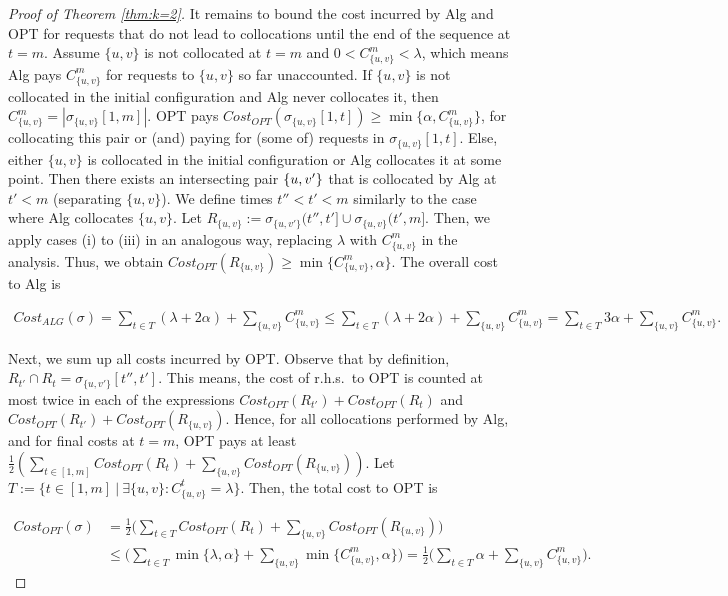 \documentclass[manuscript,screen=true, review, anonymous]{acmart}
\DeclarePairedDelimiter\set{\{}{\}}
\begin{document}
\begin{proof}[Proof of Theorem \ref{thm:k=2}]
	It remains to bound the cost incurred by Alg and OPT for requests that do not lead to collocations until the  end of the sequence at $t=m$.
	Assume $\{u,v\}$ is not collocated at $t=m$
	and $0 < C^{m}_{ \{u,v\} } < \lambda $,
	which means Alg pays $C^{m}_{ \{u,v\} }$
	for requests to $\{u,v\}$ so far unaccounted.
	If $\{u,v\}$ is not collocated in the initial configuration
	and Alg never collocates it,
	then $ C^{m}_{ \{u,v\} } =| \sigma_{\{u,v\}}[1,m] |$.
	OPT pays
	$\mathit{Cost}_{\mathit{OPT}} (\sigma_{\{u,v\}}[1,t]) 
	\geq \min{ \{ \alpha, C^{m}_{ \{u,v\} } \} }$,
	for collocating this pair or (and) paying for (some of) requests in $\sigma_{\{u,v\}}[1,t]$.
	Else,
	either $\{u,v\}$ is collocated in the initial configuration
	or Alg collocates it at some point.
	Then there exists an intersecting pair $\set{u,v'}$
	that is collocated by Alg at $t' < m$ (separating $\{u,v\}$).
	We define times $t'' < t' < m$ similarly to the case where Alg collocates $\{u,v\}$.
	Let $R_{\{u,v\}} := \sigma_{\{u,v'\}} (t'',t'] \cup \sigma_{\{u,v\}} (t',m]$.
	Then,
	we apply cases (i) to (iii) in an analogous way,
	replacing $\lambda$ with $C^{m}_{ \{u,v\}}$ in the analysis.
	Thus, 
	we obtain
	$\mathit{Cost}_{\mathit{OPT}} (R_{\{u,v\}}) 
	\geq  \min{ \{ C^{m}_{ \{u,v\}}, \alpha \}}$.
	The overall cost to Alg is
	
\begin{align*}	%
	\mathit{Cost}_{\mathit{ALG}} (\sigma)
	=
	\sum_{ t \in T}(\lambda + 2\alpha) +
	\sum_{\{u,v\}} C^{m}_{\{u,v\}}	
	\leq
	\sum_{ t \in T}(\lambda + 2\alpha) +
	\sum_{\{u,v\}} C^{m}_{\{u,v\}}	
	=
	\sum_{ t \in T} 3\alpha +
	\sum_{\{u,v\}} C^{m}_{\{u,v\}}
	.
	\end{align*}

	Next, we sum up all costs incurred by OPT.
	Observe that by definition,
	$R_{t'} \cap R_t = \sigma_{\{u,v'\}}[t'',t']$.
	This means,
	the cost of r.h.s.~to OPT is counted at most twice in each of  the expressions
	$\mathit{Cost}_{\mathit{OPT}} (R_{t'}) + \mathit{Cost}_{\mathit{OPT}} (R_t)$
	and  
	$\mathit{Cost}_{\mathit{OPT}} (R_{t'}) + \mathit{Cost}_{\mathit{OPT}} (R_{\{u,v\}})$.
	Hence,
	for all collocations performed by Alg,
	and for final costs at $t=m$,
	OPT pays at least 
	$\frac{1}{2}(
	\sum_{ t \in [1,m] } \mathit{Cost}_{\mathit{OPT}} (R_t) +
	\sum_{\{u,v\}} \mathit{Cost}_{\mathit{OPT}} (R_{\{u,v\}})
	) $.
	Let
	$T := \{ t \in [1,m] ~\vert~ \exists \{u,v\}: C^{t}_{\{u,v\}} = \lambda \}$.
	Then,
	the total cost to OPT is
	
	\begin{align*} 	%
		\mathit{Cost}_{\mathit{OPT}} (\sigma)
		&=
		\frac{1}{2}
		\Big(
		\sum_{ t \in T} \mathit{Cost}_{\mathit{OPT}} (R_t) 
		+ \sum_{\{u,v\}}\mathit{Cost}_{\mathit{OPT}} (R_{\{u,v\}})
		\Big)	\\
		&\leq
		\Big(
		\sum_{ t \in T} \min{ \{ \lambda, \alpha \}}  +
		\sum_{\{u,v\}} \min{ \{C^{m}_{\{u,v\}} , \alpha \} } 
		\Big)		
		=
		\frac{1}{2}		
		\Big(
		\sum_{ t \in T} \alpha  
		+ \sum_{\{u,v\}} C^{m}_{\{u,v\}}
		\Big).
	\end{align*}


\end{proof}
\end{document}
